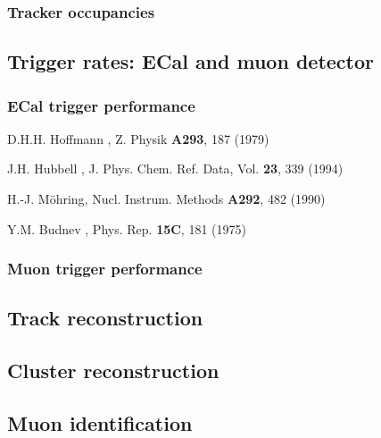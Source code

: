 \subsubsection{Tracker occupancies}

\subsection{Trigger rates: ECal and muon detector}

\subsubsection{ECal trigger performance}




\begin{thebibliography}{99}
D.H.H. Hoffmann \etal, Z. Physik {\bf A293}, 187 (1979)

J.H. Hubbell \etal, J. Phys. Chem. Ref. Data, Vol. {\bf 23}, 339 (1994) 

 H.-J. M\"{o}hring, Nucl. Instrum. Methods {\bf A292}, 482 (1990)

 Y.M. Budnev \etal, Phys. Rep. {\bf 15C}, 181 (1975)

\end{thebibliography}


\subsubsection{Muon trigger performance}

\subsection{Track reconstruction}

\subsection{Cluster reconstruction}

\subsection{Muon identification}

